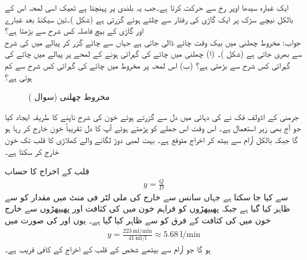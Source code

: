 ایک غبارہ سیدھا اوپر رخ  سے  حرکت کرتا ہے۔جب یہ  بلندی پر پہنچتا ہے ٹھیک اسی لمحہ اس کے بالکل نیچے سڑک پر ایک گاڑی  کی رفتار سے چلتے ہوئے گزرتی ہے (شکل )۔تین سیکنڈ بعد غبارے اور گاڑی کے بیچ فاصلہ کس شرح سے بڑھتا ہے؟  \\
جواب:\quad
{}
مخروط چھلنی میں بیک وقت چائے ڈالی جاتی ہے جہاں سے  چائے گزر کر پیالے میں  کی  شرح سے بھری جاتی ہے (شکل )۔ (ا) چھلنی میں چائے کی گہرائی  ہونے کے لمحے پر پیالے میں چائے کی گہرائی کس شرح سے بڑھتی ہے؟ (ب) اس لمحہ پر مخروط میں چائے کی گہرائی کس شرح سے کم ہوتی ہے؟
\begin{figure}
\centering
{}
\caption{مخروط چھلنی (سوال )}
\label{شکل_سوال_تفرق_مخروط_چھلنی}
\end{figure}
جرمنی کے اڈولف فک نے  کی دہائی میں دل سے گزرتے ہوئے خون کی  شرح ناپنے کا طریقہ ایجاد کیا جو آج بھی زیر استعمال ہے۔ اس وقت اس جملے کو پڑھتے ہوئے آپ کا دل تقریباً  خون خارج کر رہا ہو گا جبکہ بالکل آرام سے بیٹھ کر  اخراج متوقع ہے۔ بہت لمبی دوڑ لگانے والے کھلاڑی کا قلب   تک خون خارج کر سکتا ہے۔

قلب کے اخراج کا حساب
\begin{align*}
y=\frac{Q}{D}
\end{align*}
سے کیا جا سکتا ہے جہاں سانس سے خارج  کی  ملی لٹر فی منٹ میں مقدار کو  سے ظاہر کیا گیا ہے جبکہ پھیپھڑوں کو فراہم خون میں  کی کثافت  اور پھیپھڑوں سے خارج خون میں  کی کثافت کے فرق کو  سے ظاہر کیا گیا ہے۔ یوں  اور  کی صورت میں 
\begin{align*}
y=\frac{\SI{223}{\milli\litre/\minute}}{\SI{41}{\milli\litre/\litre}}\approx \SI{5.68}{\litre/\minute}
\end{align*}
ہو گا جو آرام سے بیٹھے شخص کے قلب کے اخراج کے کافی قریب ہے۔

